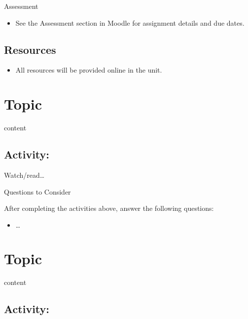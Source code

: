 \documentclass[
]{book}
\providecommand{\tightlist}{%
  \setlength{\itemsep}{0pt}\setlength{\parskip}{0pt}}
\theoremstyle{definition}
\theoremstyle{definition}
\theoremstyle{definition}
\theoremstyle{definition}
\theoremstyle{remark}
\begin{document}
\begin{assessment}
{Assessment}

\begin{itemize}
\tightlist
\item
  See the Assessment section in Moodle for assignment details and due dates.
\end{itemize}
\end{assessment}

\hypertarget{resources-1}{%
\subsection*{Resources}\label{resources-1}}

\begin{itemize}
\tightlist
\item
  All resources will be provided online in the unit.
\end{itemize}

\hypertarget{topic}{%
\section{Topic}\label{topic}}

content

\hypertarget{activity-3}{%
\subsection*{Activity:}\label{activity-3}}

\begin{reflect}
Watch/read\ldots{}

{Questions to Consider}

After completing the activities above, answer the following questions:

\begin{itemize}
\tightlist
\item
  \ldots{}
\end{itemize}
\end{reflect}

\hypertarget{topic-1}{%
\section{Topic}\label{topic-1}}

content

\hypertarget{activity-4}{%
\subsection*{Activity:}\label{activity-4}}
\end{document}
